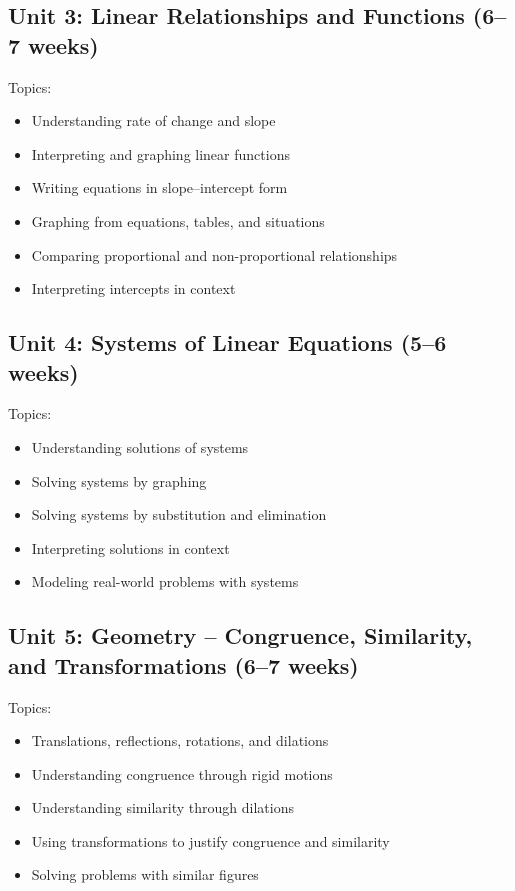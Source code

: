 \documentclass[11pt,letterpaper]{report}
\begin{document}
\subsection{Unit 3: Linear Relationships and Functions (6–7 weeks)}

Topics:
\begin{itemize}
\item Understanding rate of change and slope
\item Interpreting and graphing linear functions
\item Writing equations in slope–intercept form
\item Graphing from equations, tables, and situations
\item Comparing proportional and non-proportional relationships
\item Interpreting intercepts in context
\end{itemize}

\subsection{Unit 4: Systems of Linear Equations (5–6 weeks)}

Topics:
\begin{itemize}
\item Understanding solutions of systems
\item Solving systems by graphing
\item Solving systems by substitution and elimination
\item Interpreting solutions in context
\item Modeling real-world problems with systems
\end{itemize}

\subsection{Unit 5: Geometry – Congruence, Similarity, and Transformations (6–7 weeks)}

Topics:
\begin{itemize}
\item Translations, reflections, rotations, and dilations
\item Understanding congruence through rigid motions
\item Understanding similarity through dilations
\item Using transformations to justify congruence and similarity
\item Solving problems with similar figures
\end{itemize}
\end{document}
